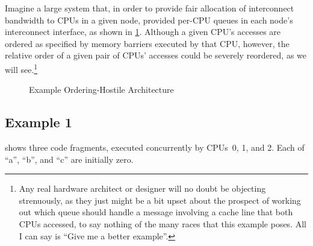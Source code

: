 \QuickQuizEnd

Imagine a large  system that,
in order to provide fair allocation
of interconnect bandwidth to CPUs in a given node, provided per-CPU
queues in each node's interconnect interface, as shown in
\cref{fig:app:whymb:Example Ordering-Hostile Architecture}.
Although a given CPU's accesses are ordered as specified by memory
barriers executed by that CPU, however, the relative order of a
given pair of CPUs' accesses could be severely reordered,
as we will see.\footnote{
	Any real hardware architect or designer will no doubt be
	objecting strenuously,
	as they just might be a bit upset about the prospect of working
	out which queue should handle a message involving a cache line
	that both CPUs accessed, to say nothing of the many races that
	this example poses.
	All I can say is ``Give me a better example''.}

\begin{figure}
\centering
{}
\caption{Example Ordering-Hostile Architecture}
\label{fig:app:whymb:Example Ordering-Hostile Architecture}
\end{figure}

\subsection{Example 1}
\label{sec:app:whymb:Example 1}

shows three code fragments, executed concurrently by CPUs~0, 1, and 2.
Each of ``a'', ``b'', and ``c'' are initially zero.


